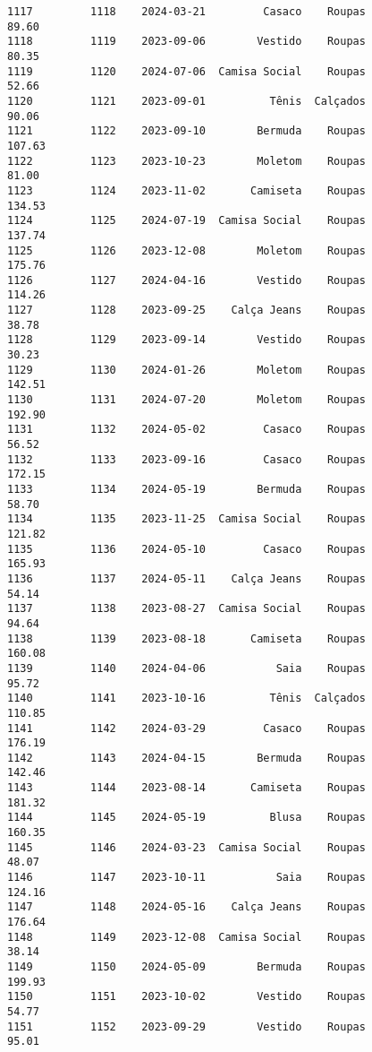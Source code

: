 \documentclass[11pt]{article}
\begin{document}
\begin{Verbatim}[commandchars=\\\{\}]
1117         1118    2024-03-21         Casaco    Roupas           89.60   
1118         1119    2023-09-06        Vestido    Roupas           80.35   
1119         1120    2024-07-06  Camisa Social    Roupas           52.66   
1120         1121    2023-09-01          Tênis  Calçados           90.06   
1121         1122    2023-09-10        Bermuda    Roupas          107.63   
1122         1123    2023-10-23        Moletom    Roupas           81.00   
1123         1124    2023-11-02       Camiseta    Roupas          134.53   
1124         1125    2024-07-19  Camisa Social    Roupas          137.74   
1125         1126    2023-12-08        Moletom    Roupas          175.76   
1126         1127    2024-04-16        Vestido    Roupas          114.26   
1127         1128    2023-09-25    Calça Jeans    Roupas           38.78   
1128         1129    2023-09-14        Vestido    Roupas           30.23   
1129         1130    2024-01-26        Moletom    Roupas          142.51   
1130         1131    2024-07-20        Moletom    Roupas          192.90   
1131         1132    2024-05-02         Casaco    Roupas           56.52   
1132         1133    2023-09-16         Casaco    Roupas          172.15   
1133         1134    2024-05-19        Bermuda    Roupas           58.70   
1134         1135    2023-11-25  Camisa Social    Roupas          121.82   
1135         1136    2024-05-10         Casaco    Roupas          165.93   
1136         1137    2024-05-11    Calça Jeans    Roupas           54.14   
1137         1138    2023-08-27  Camisa Social    Roupas           94.64   
1138         1139    2023-08-18       Camiseta    Roupas          160.08   
1139         1140    2024-04-06           Saia    Roupas           95.72   
1140         1141    2023-10-16          Tênis  Calçados          110.85   
1141         1142    2024-03-29         Casaco    Roupas          176.19   
1142         1143    2024-04-15        Bermuda    Roupas          142.46   
1143         1144    2023-08-14       Camiseta    Roupas          181.32   
1144         1145    2024-05-19          Blusa    Roupas          160.35   
1145         1146    2024-03-23  Camisa Social    Roupas           48.07   
1146         1147    2023-10-11           Saia    Roupas          124.16   
1147         1148    2024-05-16    Calça Jeans    Roupas          176.64   
1148         1149    2023-12-08  Camisa Social    Roupas           38.14   
1149         1150    2024-05-09        Bermuda    Roupas          199.93   
1150         1151    2023-10-02        Vestido    Roupas           54.77   
1151         1152    2023-09-29        Vestido    Roupas           95.01   

\end{Verbatim}
\end{document}
